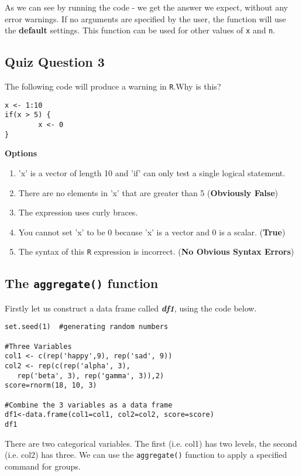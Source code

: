 \documentclass[12pt]{article}
\begin{document}
As we can see by running the code - we get the answer we expect, without any error warnings. If no arguments are specified by the user, the function will use the \textbf{default} settings. This function can be used for other values of \texttt{x} and \texttt{n}.

\newpage
\subsection*{Quiz Question 3}
The following code will produce a warning in \texttt{R}.Why is this?
\begin{framed}
\begin{verbatim}
x <- 1:10
if(x > 5) {
        x <- 0
}
\end{verbatim}
\end{framed}

\textbf{Options}
\begin{enumerate}
\item 'x' is a vector of length 10 and 'if' can only test a single logical statement.
\item There are no elements in 'x' that are greater than 5 (\textbf{Obviously False})
\item The expression uses curly braces.
\item You cannot set 'x' to be 0 because 'x' is a vector and 0 is a scalar. (\textbf{True})
\item The syntax of this \texttt{R} expression is incorrect. (\textbf{No Obvious Syntax Errors})
\end{enumerate}

\newpage
\subsection{The \texttt{aggregate()} function}
Firstly let us construct a data frame called \textit{\textbf{df1}}, using the code below.
\begin{framed}
\begin{verbatim}
set.seed(1)  #generating random numbers

#Three Variables
col1 <- c(rep('happy',9), rep('sad', 9)) 
col2 <- rep(c(rep('alpha', 3), 
   rep('beta', 3), rep('gamma', 3)),2) 
score=rnorm(18, 10, 3) 
 
#Combine the 3 variables as a data frame
df1<-data.frame(col1=col1, col2=col2, score=score) 
df1
\end{verbatim}
\end{framed}
\noindent There are two categorical variables. The first (i.e. col1) has two levels, the second (i.e. col2) has three. We can use the \texttt{aggregate()} function to apply a specified command for groups.
\end{document}
